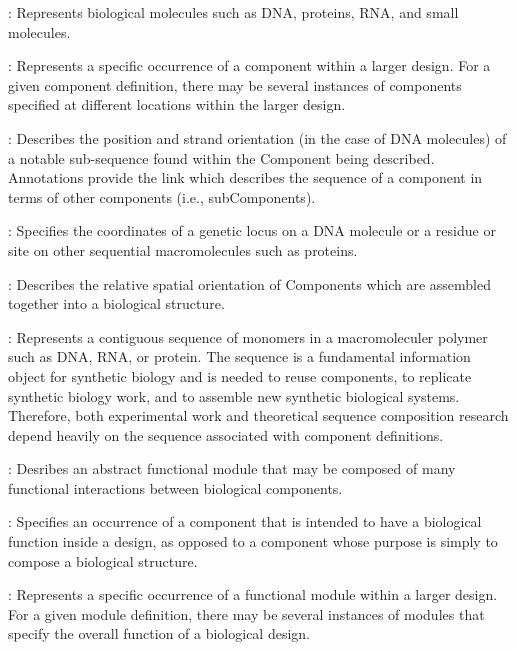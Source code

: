 \begin{description}
  
\item \emph{}: Represents biological molecules such as DNA, proteins, RNA, and small molecules.

\item \emph{}:
Represents a specific occurrence of a component within a larger design.  For a given component definition, there may be several instances of components specified at different locations within the larger design.
\item \emph{}:
Describes the position and strand orientation (in the case of DNA molecules) of a notable sub-sequence found within the Component being
described. Annotations provide the link which describes the 
sequence of a component in terms of other components (i.e.,
subComponents).
\item \emph{}:
Specifies the coordinates of a genetic locus on a DNA molecule or a residue or site on other sequential macromolecules such as proteins.
\item \emph{}:
Describes the relative spatial orientation of Components which are assembled together into a biological structure.
\item \emph{}:
Represents a contiguous sequence of monomers in a macromoleculer polymer such as DNA, RNA, or protein. The
sequence is a fundamental information object for synthetic biology and is needed to reuse components, to replicate synthetic biology work, and to assemble new synthetic biological systems. Therefore, both experimental work and theoretical sequence composition research depend heavily on the sequence associated with component definitions.
\item \emph{}:
Desribes an abstract functional module that may be composed of many functional interactions between biological components.
\item \emph{}:
Specifies an occurrence of a component that is intended to have a biological function inside a design, as opposed to a component whose purpose is simply to compose a biological structure. 
\item \emph{}:
Represents a specific occurrence of a functional module within a larger design.  For a given module definition, there may be several instances of modules that specify the overall function of a biological design.

\end{description}

